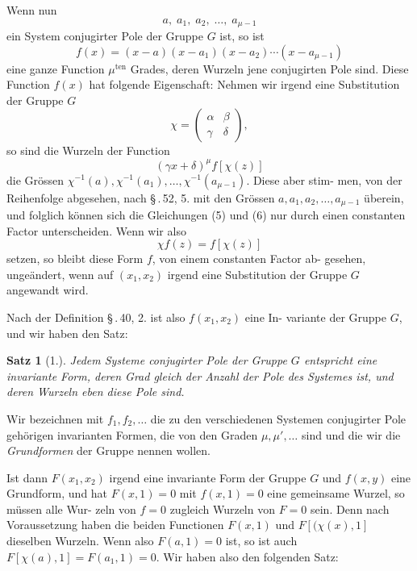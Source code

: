 \documentclass[12pt,a4paper]{article}
\theoremstyle{plain}
\newtheorem{satz}{Satz}[section]
\theoremstyle{definition}
\theoremstyle{remark}
\begin{document}
Wenn nun
\begin{equation}\label{eq:54_4}
a,\; a_1,\; a_2,\; \ldots,\; a_{\mu-1}\tag{4}
\end{equation}
ein System conjugirter Pole der Gruppe $G$ ist, so ist
\begin{equation}\label{eq:54_5}
f(x) = (x-a)(x-a_1)(x-a_2)\cdots(x-a_{\mu-1})\tag{5}
\end{equation}
eine ganze Function $\mu^{\text{ten}}$ Grades, deren Wurzeln jene conjugirten
Pole sind. Diese Function $f(x)$ hat folgende Eigenschaft:
Nehmen wir irgend eine Substitution der Gruppe $G$
\[
\chi = \begin{pmatrix}\alpha & \beta\\ \gamma & \delta\end{pmatrix},
\]
so sind die Wurzeln der Function
\begin{equation}\label{eq:54_6}
(\gamma x + \delta)^\mu f[\chi(z)]\tag{6}
\end{equation}
die Gr\"ossen $\chi^{-1}(a), \chi^{-1}(a_1), \ldots, \chi^{-1}(a_{\mu-1})$. Diese aber stim-
men, von der Reihenfolge abgesehen, nach \S\,.\,52, 5. mit den
Gr\"ossen $a, a_1, a_2, \ldots, a_{\mu-1}$ \"uberein, und folglich k\"onnen sich die
Gleichungen (5) und (6) nur durch einen constanten Factor
unterscheiden. Wenn wir also
\begin{equation}\label{eq:54_7}
\chi f(z) = f[\chi(z)]\tag{7}
\end{equation}
setzen, so bleibt diese Form $f$, von einem constanten Factor ab-
gesehen, unge\"andert, wenn auf $(x_1, x_2)$ irgend eine Substitution
der Gruppe $G$ angewandt wird.

Nach der Definition \S\,.\,40, 2. ist also $f(x_1, x_2)$ eine In-
variante der Gruppe $G$, und wir haben den Satz:

\begin{satz}[1.]
Jedem Systeme conjugirter Pole der Gruppe $G$
entspricht eine invariante Form, deren Grad
gleich der Anzahl der Pole des Systemes ist, und
deren Wurzeln eben diese Pole sind.
\end{satz}

Wir bezeichnen mit $f_1, f_2, \ldots$ die zu den verschiedenen
Systemen conjugirter Pole geh\"origen invarianten Formen, die
von den Graden $\mu, \mu', \ldots$ sind und die wir die \emph{Grundformen}
der Gruppe nennen wollen.

Ist dann $F(x_1, x_2)$ irgend eine invariante Form der
Gruppe $G$ und $f(x, y)$ eine Grundform, und hat $F(x, 1) = 0$
mit $f(x, 1) = 0$ eine gemeinsame Wurzel, so m\"ussen alle Wur-
zeln von $f = 0$ zugleich Wurzeln von $F = 0$ sein. Denn
nach Voraussetzung haben die beiden Functionen $F(x, 1)$ und
$F[(\chi(x), 1]$ dieselben Wurzeln. Wenn also $F(a, 1) = 0$ ist,
so ist auch $F[\chi(a), 1] = F(a_1,1) = 0$. Wir haben also den
folgenden Satz:
\end{document}
